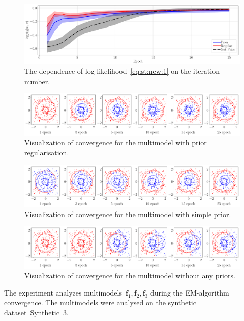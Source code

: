 \documentclass[12pt, twoside]{article}
\numberwithin{equation}{section}
\begin{document}
\begin{figure}[h!t]\center
\includegraphics[width=1\textwidth]{result_eng/experiment_synt_likelihood_progress}
\caption{The dependence of log-likelihood~\eqref{eq:st:new:1} on the iteration number.}
\label{experiment:st:2:2}
\end{figure}

\begin{figure}[h!t]\center
\includegraphics[width=1\textwidth]{result_eng/experiment_synt_regular_progress}
\caption{Visualization of convergence for the multimodel with prior regularisation.}
\label{experiment:st:2:3}
\end{figure}

\begin{figure}[h!t]\center
\includegraphics[width=1\textwidth]{result_eng/experiment_synt_prior_progress}
\caption{Visualization of convergence for the multimodel with simple prior.}
\label{experiment:st:2:4}
\end{figure}

\begin{figure}[h!t]\center
\includegraphics[width=1\textwidth]{result_eng/experiment_synt_not_prior_progress}
\caption{Visualization of convergence for the multimodel without any priors.}
\label{experiment:st:2:5}
\end{figure}
The experiment analyzes multimodels~$\textbf{f}_1, \textbf{f}_2, \textbf{f}_3$ during the EM-algorithm convergence.
The multimodels were analysed on the synthetic dataset~Synthetic~3.
\end{document}
